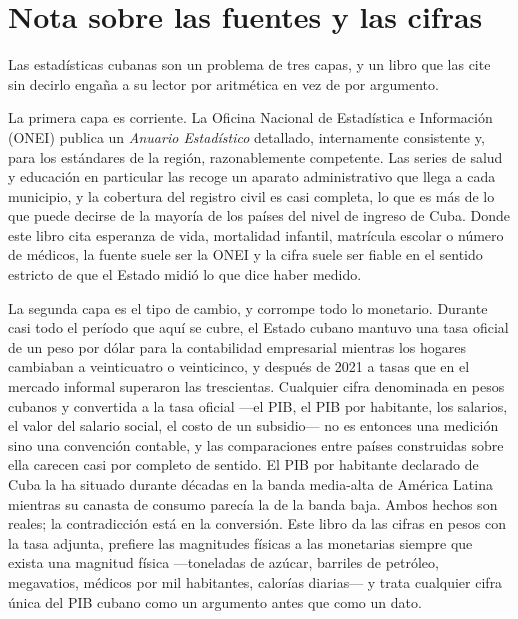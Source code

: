 \chapter*{Nota sobre las fuentes y las cifras}

Las estadísticas cubanas son un problema de tres capas, y un libro que las cite
sin decirlo engaña a su lector por aritmética en vez de por argumento.

La primera capa es corriente. La Oficina Nacional de Estadística e Información
(ONEI) publica un \emph{Anuario Estadístico} detallado, internamente
consistente y, para los estándares de la región, razonablemente competente. Las
series de salud y educación en particular las recoge un aparato administrativo
que llega a cada municipio, y la cobertura del registro civil es casi completa,
lo que es más de lo que puede decirse de la mayoría de los países del nivel de
ingreso de Cuba. Donde este libro cita esperanza de vida, mortalidad infantil,
matrícula escolar o número de médicos, la fuente suele ser la ONEI y la cifra
suele ser fiable en el sentido estricto de que el Estado midió lo que dice haber
medido.

La segunda capa es el tipo de cambio, y corrompe todo lo monetario. Durante casi
todo el período que aquí se cubre, el Estado cubano mantuvo una tasa oficial de
un peso por dólar para la contabilidad empresarial mientras los hogares cambiaban
a veinticuatro o veinticinco, y después de 2021 a tasas que en el mercado
informal superaron las trescientas. Cualquier cifra denominada en pesos cubanos y
convertida a la tasa oficial ---el PIB, el PIB por habitante, los salarios, el
valor del salario social, el costo de un subsidio--- no es entonces una medición
sino una convención contable, y las comparaciones entre países construidas sobre
ella carecen casi por completo de sentido. El PIB por habitante declarado de
Cuba la ha situado durante décadas en la banda media-alta de América Latina
mientras su canasta de consumo parecía la de la banda baja. Ambos hechos son
reales; la contradicción está en la conversión. Este libro da las cifras en pesos
con la tasa adjunta, prefiere las magnitudes físicas a las monetarias siempre que
exista una magnitud física ---toneladas de azúcar, barriles de petróleo,
megavatios, médicos por mil habitantes, calorías diarias--- y trata cualquier
cifra única del PIB cubano como un argumento antes que como un dato.


